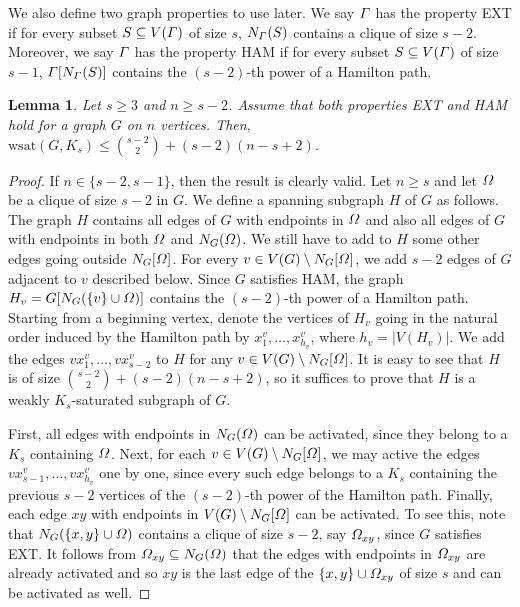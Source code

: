 \documentclass[hidelinks, 11pt]{article}
\theoremstyle{plain}
\newtheorem{lemma}[theorem]{Lemma}
\theoremstyle{definition}
\begin{document}
We  also  define  two graph properties to use later.
We say     $\mathnormal{\Gamma}$ has the property {\sf EXT} if for every subset $S\subseteq V(\mathnormal{\Gamma})$  of size $s$, $N_\mathnormal{\Gamma}(S)$ contains a clique of size  $s-2$.
Moreover, we say   $\mathnormal{\Gamma}$ has the property {\sf HAM} if for every subset $S\subseteq V(\mathnormal{\Gamma})$  of size $s-1$,  $\mathnormal{\Gamma}[N_\mathnormal{\Gamma}(S)]$ contains the $(s-2)$-th power of a Hamilton path.



\begin{lemma}\label{11}
Let   $s\geq 3$   and     $n\geq s-2$. Assume that  both properties  {\sf EXT} and {\sf HAM} hold for a graph $G$ on $n$ vertices. Then,  $\mathrm{wsat}(G,K_s)\leq{s-2 \choose 2}+(s-2)(n-s+2)$.
\end{lemma}



\begin{proof}
If $n\in\{s-2, s-1\}$, then the  result is clearly valid.    Let $n\geq s$ and let $\mathnormal{\Omega}$ be a clique of size $s-2$  in $G$. We define a  spanning   subgraph $H$ of $G$ as follows.  The  graph  $H$ contains all edges of $G$ with endpoints in $\mathnormal{\Omega}$  and  also   all edges of $G$ with endpoints in both  $\mathnormal{\Omega}$ and $N_G(\mathnormal{\Omega})$. We still have to add to $H$  some other edges going outside $N_G[\mathnormal{\Omega}]$. For every $v\in V(G)\setminus N_G[\mathnormal{\Omega}]$, we add    $s-2$ edges of $G$ adjacent to $v$ described below.  Since $G$   satisfies    {\sf HAM},  the graph $H_v=G[N_G(\{v\}\cup\mathnormal{\Omega})]$ contains  the  $(s-2)$-th power of a Hamilton path. Starting from  a beginning vertex, denote the vertices of $H_v$ going in the natural order induced by the Hamilton path  by $x^v_1, \ldots, x^v_{h_v}$, where $h_v=|V(H_v)|$. We add the  edges $vx^v_1,  \ldots,  vx^v_{s-2}$ to $H$ for any $v\in V(G)\setminus N_G[\mathnormal{\Omega}]$. It is easy to see that $H$ is of size ${s-2 \choose 2}+(s-2)(n-s+2)$, so it suffices to prove that $H$ is a weakly $K_s$-saturated subgraph of  $G$.


First, all edges with endpoints in  $N_G(\mathnormal{\Omega})$ can be activated,  since they  belong to a  $K_s$ containing  $\mathnormal{\Omega}$. Next, for each $v \in V(G)\setminus N_G[\mathnormal{\Omega}]$, we may active  the edges $vx^v_{s-1},  \ldots, vx^v_{h_v}$ one by one,  since every such edge belongs to a $K_s$  containing the previous $s-2$ vertices of the $(s-2)$-th power of the Hamilton path. Finally, each edge $xy$ with endpoints in $V(G)\setminus N_G[\mathnormal{\Omega}]$ can be activated. To see this, note that    $N_G(\{x, y\}\cup\mathnormal{\Omega})$ contains a clique of size $s-2$,  say $\mathnormal{\Omega}_{xy}$, since  $G$   satisfies  {\sf EXT}.  It follows from   $\mathnormal{\Omega}_{xy}\subseteq N_G(\mathnormal{\Omega})$ that the edges  with endpoints in  $\mathnormal{\Omega}_{xy}$ are already activated   and  so $xy$ is the last edge of the  $\{x,y\}\cup\mathnormal{\Omega}_{xy}$ of size $s$ and   can be activated  as well.
\end{proof}
\end{document}
